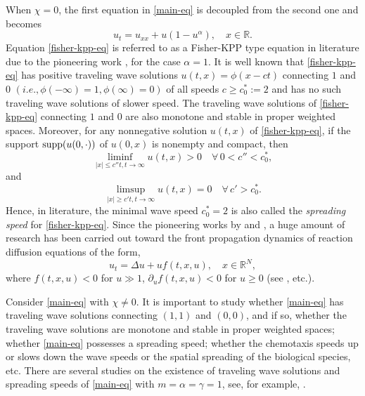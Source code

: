 \documentclass[11pt]{article} %
\theoremstyle{remark}
\theoremstyle{remark}
\numberwithin{equation}{section}
\numberwithin{figure}{section}
\numberwithin{table}{section}
\def\R{\mathbb R}
\newcommand\RR{\ensuremath{\mathbb{R}}}
\begin{document}
When $\chi=0$, the first equation in \eqref{main-eq} is decoupled from the second one and becomes
\begin{equation}
\label{fisher-kpp-eq}
u_t=u_{xx}+u(1-u^\alpha),\quad x\in\RR.
\end{equation}
Equation \eqref{fisher-kpp-eq} is referred to as  a Fisher-KPP type equation in literature due to the pioneering work 
\cite{Fisher}, \cite{KPP} for the case $\alpha=1$. It is well known that \eqref{fisher-kpp-eq}  has positive  traveling wave solutions $u(t,x)=\phi(x-ct)$ connecting $1$ and $0$ $(i.e., \phi(-\infty)=1,\phi(\infty)=0)$ of all speeds $c\geq c_0^*:=2$ and
has no such traveling wave solutions of slower
 speed. The traveling wave solutions of \eqref{fisher-kpp-eq} connecting $1$ and $0$ are also monotone and stable in proper weighted spaces.    Moreover, 
 for any
nonnegative solution $u(t,x)$ of \eqref{fisher-kpp-eq}, if  the support ${\rm supp}(u(0,\cdot))$ of
$u(0,x)$  is nonempty and compact, then
\begin{equation}
\label{spreading-eq1}
\liminf _{|x|\le c''t, t\to \infty} u(t,x) >0\quad \forall\,  0<c''<c_0^*,
\end{equation}
and
\begin{equation}
\label{spreading-eq2}
\limsup_{|x| \ge c't, t\to \infty}u(t,x)=0 \quad \forall \, c'>c_0^*.
\end{equation}
Hence, in
literature,  the minimal wave speed $c^*_0=2$ is   also called the {\it
spreading speed} for \eqref{fisher-kpp-eq}.  Since the pioneering works by \cite{Fisher} and \cite{KPP},  a huge amount  of research has been carried out toward the front propagation dynamics of
  reaction diffusion equations of the form,
\begin{equation}
\label{general-fisher-eq}
u_t=\Delta u+u f(t,x,u),\quad x\in\R^N,
\end{equation}
where $f(t,x,u)<0$ for $u\gg 1$,  $\partial_u f(t,x,u)<0$ for $u\ge 0$ (see \cite{ArWe2,BeHaNa1,BeHaNa2,Henri1,Fre,FrGa,LiZh,LiZh1,Nad,NoRuXi,NoXi1,She1,She2,Wei1,Wei2,Zla}, etc.).

\smallskip


Consider \eqref{main-eq} with $\chi\not =0$.  It is important to study whether  \eqref{main-eq} has traveling wave solutions connecting $(1,1)$ and $(0,0)$, and if so, whether the traveling wave solutions are monotone and stable in proper weighted spaces; whether \eqref{main-eq} possesses a spreading speed;  whether the chemotaxis speeds up or slows down the wave speeds or the spatial spreading of the biological species, etc. 
There are several studies on the existence of  traveling wave solutions  and spreading speeds of \eqref{main-eq} with $m=\alpha=\gamma=1$,  see, for example, \cite{AvHoSc2025, GrHeTu2023, HaHe2020, Hen2022,  HeRe2024, NaPeRy2008, Sal2019, SaSh2017, SaSh2017-1,
SaSh2018, SaSh2019, SaSh2020, SaShXu2019}. 
\end{document}
